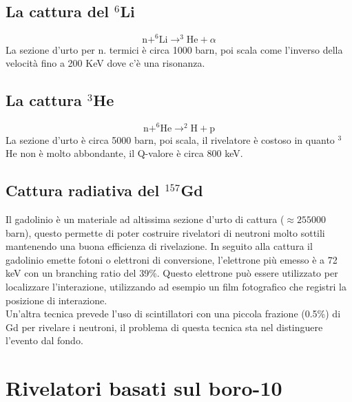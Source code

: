 \subsection{La cattura del $^{6}$Li}
\begin{equation*}
\text{n} + ^{6} \text{Li} \to ^3 \text{He} + \alpha
\end{equation*}
La sezione d'urto per n. termici \`e circa 1000 barn, poi scala come l'inverso della velocit\`a fino a 200 KeV dove c'\`e una risonanza.
\subsection{La cattura $^{3}$He}
\begin{equation*}
\text{n} + ^{6}\text{He} \to ^2\text{H} + \text{p}
\end{equation*}
La sezione d'urto \`e circa 5000 barn, poi scala, il rivelatore \`e costoso in quanto $^3$He non \`e molto abbondante, il Q-valore \`e circa 800 keV.
\subsection{Cattura radiativa del $^{157}$Gd}
Il gadolinio \`e un materiale ad altissima sezione d'urto di cattura ($\approx 255000$ barn), questo permette di poter costruire
rivelatori di neutroni molto sottili mantenendo una buona efficienza di rivelazione.
In seguito alla cattura il gadolinio emette fotoni o elettroni di conversione, l'elettrone pi\`u emesso \`e a 72 keV con un branching ratio del 39\%.
Questo elettrone pu\`o essere utilizzato per localizzare l'interazione, utilizzando ad esempio un film fotografico che registri la posizione di interazione.\\
Un'altra tecnica prevede l'uso di scintillatori con una piccola frazione (0.5\%) di Gd per rivelare i neutroni, il problema di questa tecnica sta nel
distinguere l'evento dal fondo.
\section{Rivelatori basati sul boro-10}
